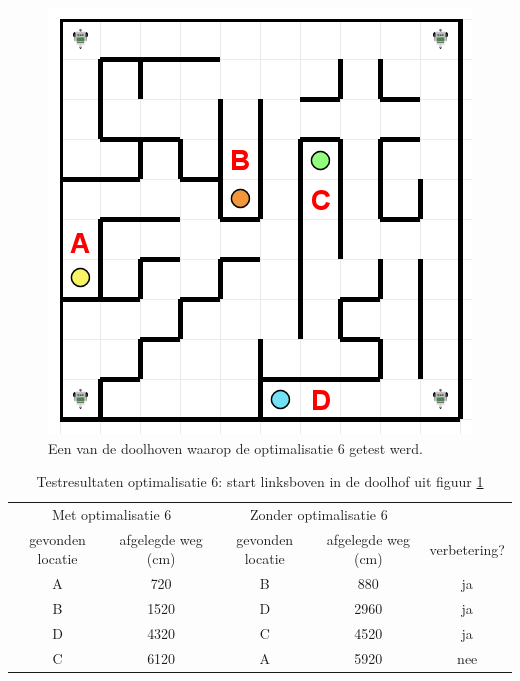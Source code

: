 \documentclass[tt3]{penoverslag}
\begin{document}
\begin{figure}[!hb]
\centering
	\includegraphics[scale=0.5]{doolhof3}
	\caption{Een van de doolhoven waarop de optimalisatie 6 getest werd.}
\label{fig:TestDead}
\end{figure}

\begin{table}[h]
\begin{center}
    \begin{tabular}{ c | c | c | c | c}
   \multicolumn{2}{c|}{Met optimalisatie 6} & \multicolumn{2}{|c|}{Zonder optimalisatie 6} & \\
     gevonden locatie & afgelegde weg (cm) & gevonden locatie &  afgelegde weg (cm) & verbetering?\\ \hline\hline
    A & 720 & B & 880 & ja \\ \hline
    B & 1520 & D & 2960 & ja \\ \hline
    D & 4320 & C & 4520 & ja\\ \hline
    C & 6120 & A & 5920 & nee\\
    \end{tabular}
    \caption{Testresultaten optimalisatie 6: start linksboven in de doolhof uit figuur \ref{fig:TestDead}}
    \label{tab:resultVerken1}
\end{center}
\end{table}
\end{document}
